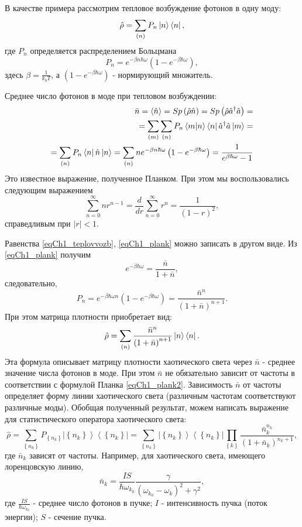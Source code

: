 В качестве примера рассмотрим тепловое возбуждение фотонов в одну
моду:
\begin{equation}
\hat{\rho} = \sum_{(n)}
P_n\ket{n}\bra{n},
\label{eqCh1_teplovvozb}
\end{equation}
где $P_n$ определяется распределением Больцмана
\[
P_n = e^{-\beta n \hbar \omega}\left(1  -  e^{-\beta \hbar \omega}\right),
\]
здесь  $\beta = \frac{1}{k_b T}$, а $\left(1  -  e^{-\beta \hbar
  \omega}\right)$ - нормирующий множитель. 

Среднее число фотонов в моде при тепловом возбуждении:
\begin{eqnarray}
\bar{n} = \left<\hat{n}\right> =  Sp \left(\hat{\rho}\hat{n}\right) = 
Sp \left(\hat{\rho}\hat{a}^{\dag}\hat{a}\right) = 
\nonumber \\
=\sum_{(m)}\sum_{(n)}
P_n\bra{m}\ket{n}\bra{n}\hat{a}^{\dag}\hat{a}\ket{m}
= 
\nonumber \\
= \sum_{(n)}
P_n\bra{n}\hat{n}\ket{n} = \sum_{(n)} n
e^{-\beta n \hbar \omega}\left(1  -  e^{-\beta \hbar \omega}\right) = 
\frac{1}{e^{\beta \hbar \omega} - 1}
\label{eqCh1_plank}
\end{eqnarray}
Это известное выражение, полученное Планком. При этом мы
воспользовались следующим выражением
\[
\sum_{n=0}^{\infty} n r^{n -1} = \frac{d}{d r} \sum_{n=0}^{\infty}
r^{n} = \frac{1}{\left(1 - r\right)^2},
\]
справедливым при $\left|r\right| < 1$.

Равенства \eqref{eqCh1_teplovvozb}, \eqref{eqCh1_plank} можно записать в
другом виде. Из \eqref{eqCh1_plank} получим 
\[
e^{-\beta \hbar \omega} = \frac{\bar{n}}{1 + \bar{n}},
\]
следовательно, 
\begin{equation}
P_n = e^{-\beta \hbar \omega n} \left(1  -  e^{-\beta \hbar
  \omega}\right) = \frac{\bar{n}^n}{\left(1 + \bar{n}\right)^{n+1}}.
\label{eqCh1_plank2}
\end{equation}
При этом матрица плотности 
приобретает вид:
\[
\hat{\rho} = \sum_{(n)}\frac{\bar{n}^n}{\left(1 + \bar{n}\right)^{n+1}}\ket{n}\bra{n}.
\]
Эта формула описывает матрицу плотности хаотического света через
$\bar{n}$ -  среднее значение числа фотонов в моде. При этом
$\bar{n}$ не обязательно зависит от частоты в соответствии с формулой
Планка \eqref{eqCh1_plank2}. Зависимость $\bar{n}$ от частоты
определяет форму линии хаотического света (различным частотам
соответствуют различные моды). Обобщая полученный результат, можем
написать выражение для статистического оператора хаотического света:  
\begin{equation}
\hat{\rho} = \sum_{\left\{n_k\right\}} P_{\left\{n_k\right\}} \left|\left\{n_k\right\}\right>\left<\left\{n_k\right\}\right| = 
\sum_{\left\{n_k\right\}} 
 \left|\left\{n_k\right\}\right>\left<\left\{n_k\right\}\right|
\prod_{\left\{k\right\}} 
\frac{\bar{n}_k^{n_k}}{\left(1 + \bar{n}_k\right)^{n_k+1}},
\label{eqCh1_102}
\end{equation}
где $\bar{n}_k$  зависят от частоты. Например, для хаотического света,
имеющего лоренцовскую линию, 
\[
\bar{n}_k = \frac{I S}{\hbar \omega_{k_0}}
\frac{\gamma}{\left(\omega_{k_0} - \omega_{k}\right)^2 + \gamma^2},
\]
где $\frac{I S}{\hbar \omega_{k_0}}$   -  среднее число фотонов в
пучке;  $I$ -  интенсивность пучка (поток энергии);  $S$ -  сечение
пучка.  
